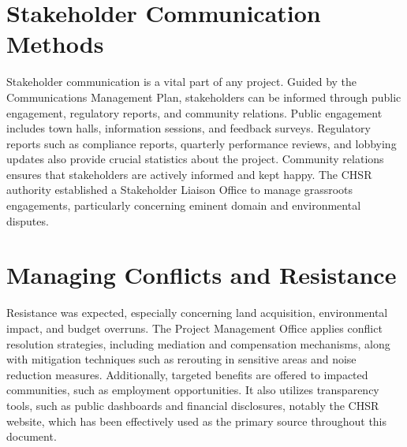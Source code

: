 \section{Stakeholder Communication Methods}
\parindent20pt Stakeholder communication is a vital part of any project. Guided by the Communications Management Plan, stakeholders can be informed through public engagement, regulatory reports, and community relations. Public engagement includes town halls, information sessions, and feedback surveys. Regulatory reports such as compliance reports, quarterly performance reviews, and lobbying updates also provide crucial statistics about the project. Community relations ensures that stakeholders are actively informed and kept happy. The CHSR authority established a Stakeholder Liaison Office to manage grassroots engagements, particularly concerning eminent domain and environmental disputes.

\section{Managing Conflicts and Resistance}
Resistance was expected, especially concerning land acquisition, environmental impact, and budget overruns. The Project Management Office applies conflict resolution strategies, including mediation and compensation mechanisms, along with mitigation techniques such as rerouting in sensitive areas and noise reduction measures. Additionally, targeted benefits are offered to impacted communities, such as employment opportunities. It also utilizes transparency tools, such as public dashboards and financial disclosures, notably the CHSR website, which has been effectively used as the primary source throughout this document. \par
